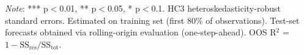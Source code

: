\par\vspace{4pt}
\begin{minipage}{\linewidth}
  \footnotesize \textit{Note}: *** p$<$0.01, ** p$<$0.05, * p$<$0.1. HC3 heteroskedasticity-robust standard errors. Estimated on training set (first 80\% of observations). Test-set forecasts obtained via rolling-origin evaluation (one-step-ahead). OOS R$^2$ = $1 - \text{SS}_{\text{res}} / \text{SS}_{\text{tot}}$.
\end{minipage}